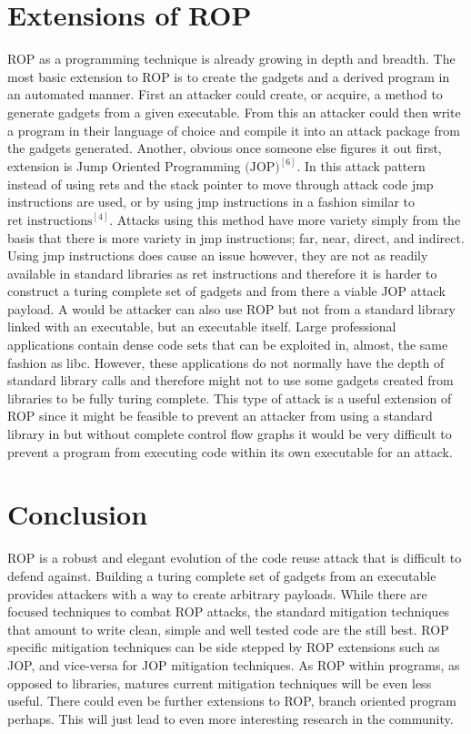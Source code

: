 \documentclass[11pt]{amsart}
\begin{document}
\section*{Extensions of ROP}
ROP as a programming technique is already growing in depth and breadth. The most basic extension to ROP is to create the gadgets and a derived program in an automated manner. First an attacker could create, or acquire, a method to generate gadgets from a given executable. From this an attacker could then write a program in their language of choice and compile it into an attack package from the gadgets generated.\newline \newline
Another, obvious once someone else figures it out first, extension is Jump Oriented Programming $\text{(JOP)}^{[6]}$. In this attack pattern instead of using rets and the stack pointer to move through attack code jmp instructions are used, or by using jmp instructions in a fashion similar to $\text{ret instructions}^{[4]}$. Attacks using this method have more variety simply from the basis that there is more variety in jmp instructions; far, near, direct, and indirect. Using jmp instructions does cause an issue however, they are not as readily available in standard libraries as ret instructions and therefore it is harder to construct a turing complete set of gadgets and from there a viable JOP attack payload.\newline \newline
A would be attacker can also use ROP but not from a standard library linked with an executable, but an executable itself. Large professional applications contain dense code sets that can be exploited in, almost, the same fashion as libc. However, these applications do not normally have the depth of standard library calls and therefore might not to use some gadgets created from libraries to be fully turing complete. This type of attack is a useful extension of ROP since it might be feasible to prevent an attacker from using a standard library in but without complete control flow graphs it would be very difficult to prevent a program from executing code within its own executable for an attack.
\section*{Conclusion}
ROP is a robust and elegant evolution of the code reuse attack that is difficult to defend against. Building a turing complete set of gadgets from an executable provides attackers with a way to create arbitrary payloads. While there are focused techniques to combat ROP attacks, the standard mitigation techniques that amount to write clean, simple and well tested code are the still best. ROP specific mitigation techniques can be side stepped by ROP extensions such as JOP, and vice-versa for JOP mitigation techniques. As ROP within programs, as opposed to libraries, matures current mitigation techniques will be even less useful. There could even be further extensions to ROP, branch oriented program perhaps. This will just lead to even more interesting research in the community.
\end{document}
